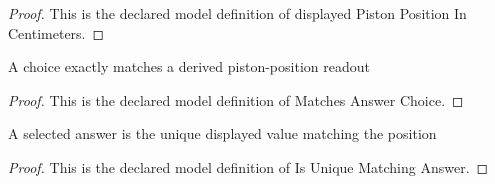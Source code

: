 \begin{proof}
  This is the declared model definition of displayed Piston Position In Centimeters.
\end{proof}
\begin{definition}
  \label{def:physics:phyx-mini-0359:phyxminiproblems-problemphyxmini0359-matchesanswerchoice}
  A choice exactly matches a derived piston-position readout
\end{definition}
\begin{proof}
  This is the declared model definition of Matches Answer Choice.
\end{proof}
\begin{definition}
  \label{def:physics:phyx-mini-0359:phyxminiproblems-problemphyxmini0359-isuniquematchinganswer}
  A selected answer is the unique displayed value matching the position
\end{definition}
\begin{proof}
  This is the declared model definition of Is Unique Matching Answer.
\end{proof}
